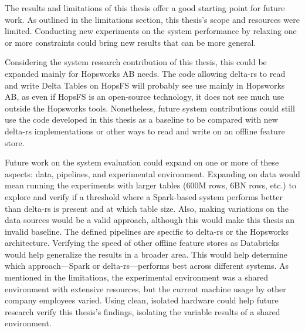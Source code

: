 The results and limitations of this thesis offer a good starting point for future work. As outlined in the limitations section, this thesis's scope and resources were limited. Conducting new experiments on the system performance by relaxing one or more constraints could bring new results that can be more general.

Considering the system research contribution of this thesis, this could be expanded mainly for Hopsworks \gls{AB} needs. The code allowing delta-rs to read and write Delta Tables on \gls{HopsFS} will probably see use mainly in Hopsworks \gls{AB}, as even if \gls{HopsFS} is an open-source technology, it does not see much use outside the Hopsworks tools. Nonetheless, future system contributions could still use the code developed in this thesis as a baseline to be compared with new delta-rs implementations or other ways to read and write on an offline feature store.

Future work on the system evaluation could expand on one or more of these aspects: data, pipelines, and experimental environment. Expanding on data would mean running the experiments with larger tables (600M rows, 6BN rows, etc.) to explore and verify if a threshold where a Spark-based system performs better than delta-rs is present and at which table size. Also, making variations on the data sources would be a valid approach, although this would make this thesis an invalid baseline. The defined pipelines are specific to delta-rs or the Hopsworks architecture. Verifying the speed of other offline feature stores as Databricks would help generalize the results in a broader area. This would help determine which approach—Spark or delta-rs—performs best across different systems.
As mentioned in the limitations, the experimental environment was a shared environment with extensive resources, but the current machine usage by other company employees varied. Using clean, isolated hardware could help future research verify this thesis's findings, isolating the variable results of a shared environment.